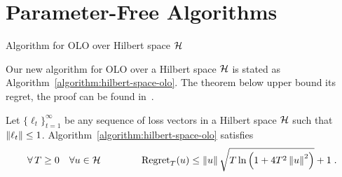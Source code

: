 \section{Parameter-Free Algorithms}
\label{section:algorithms}

\begin{algorithm}[t]
\caption{Algorithm for OLO over Hilbert space $\mathcal{H}$
\label{algorithm:hilbert-space-olo}}
\begin{algorithmic}[1]
{
\ENDFOR
}
\end{algorithmic}
\end{algorithm}

Our new algorithm for \ac{OLO} over a Hilbert space $\mathcal{H}$ is stated as
Algorithm~\ref{algorithm:hilbert-space-olo}.  The theorem below upper bound its
regret, the proof can be found in~\cite{Orabona-Pal-2016-parameter-free}.

\begin{theorem}
\label{theorem:hilbert-space-olo-regret}
Let $\{\ell_t\}_{t=1}^\infty$ be any sequence of loss vectors
in a Hilbert space $\mathcal{H}$ such that $\left\|{\ell_t}\right\| \le 1$.
Algorithm~\ref{algorithm:hilbert-space-olo} satisfies
$$
\forall \, T \ge 0 \quad
\forall u \in \mathcal{H} \qquad \qquad
\operatorname{Regret}_T(u) \le \left\|{u}\right\| \sqrt{T \ln\left(1 + 4T^2 \left\|{u}\right\|^2 \right)} + 1 \;.
$$
\end{theorem}
